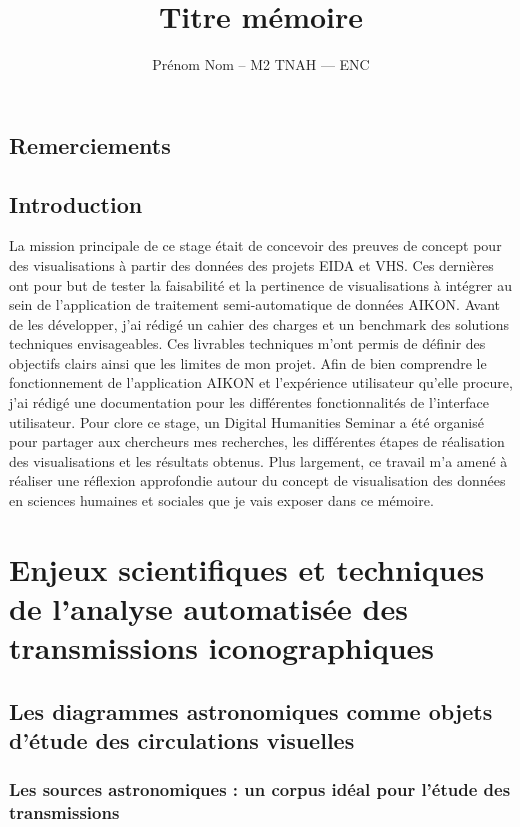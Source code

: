 \documentclass[a4paper,12pt,twoside]{book}
\author{Prénom Nom – M2 TNAH — ENC}
\title{Titre mémoire}
\newcommand\chapterNo[1]{
	\chapter*{#1}
	\markright{\MakeUppercase{#1}}
}
\begin{document}
	
	\onehalfspacing 
	
	\frontmatter
	
	
	
	\thispagestyle{empty}	
	\cleardoublepage
	
	
	
	\chapterNo{Remerciements}
	
	\chapterNo{Introduction}
	
	La mission principale de ce stage était de concevoir des preuves de concept pour des visualisations à partir des données des projets EIDA et VHS. Ces dernières ont pour but de tester la faisabilité et la pertinence de visualisations à intégrer au sein de l’application de traitement semi-automatique de données AIKON. Avant de les développer, j’ai rédigé un cahier des charges et un benchmark des solutions techniques envisageables. Ces livrables techniques m’ont permis de définir des objectifs clairs ainsi que les limites de mon projet. Afin de bien comprendre le fonctionnement de l’application AIKON et l’expérience utilisateur qu’elle procure, j’ai rédigé une documentation pour les différentes fonctionnalités de l’interface utilisateur. Pour clore ce stage, un Digital Humanities Seminar a été organisé pour partager aux chercheurs mes recherches, les différentes étapes de réalisation des visualisations et les résultats obtenus. Plus largement, ce travail m’a amené à réaliser une réflexion approfondie autour du concept de visualisation des données en sciences humaines et sociales que je vais exposer dans ce mémoire. 
	
	
	\thispagestyle{empty}
	\cleardoublepage
	
	\mainmatter
	
	\part{Enjeux scientifiques et techniques de l'analyse automatisée des transmissions iconographiques}
	\chapter{Les diagrammes astronomiques comme objets d'étude des circulations visuelles}
	\section{Les sources astronomiques : un corpus idéal pour l'étude des transmissions}
	
\end{document}
